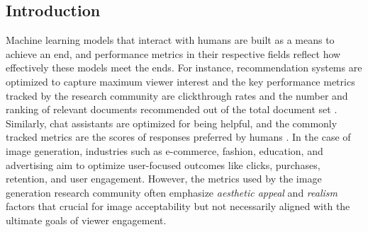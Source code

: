 \subsection{Introduction}
 \label{sec:intro}

 
 Machine learning models that interact with humans are built as a means to achieve an end, and performance metrics in their respective fields reflect how effectively these models meet the ends. For instance, recommendation systems are optimized to capture maximum viewer interest and the key performance metrics tracked by the research community are clickthrough rates and the number and ranking of relevant documents recommended out of the total document set \cite{bobadilla2013recommender}. Similarly, chat assistants are optimized for being helpful, and the commonly tracked metrics are the scores of responses preferred by humans \cite{ouyang2022training,stiennon2020learning}. In the case of image generation, industries such as e-commerce, fashion, education, and advertising aim to optimize user-focused outcomes like clicks, purchases, retention, and user engagement. However, the metrics used by the image generation research community often emphasize \textit{aesthetic appeal} \cite{xu2024imagereward,kirstain2023pick,black2023training} and \textit{realism} \cite{dhariwal2021diffusion,saharia2022photorealistic,ho2020denoising,rombach2022high} factors that crucial for image acceptability but not necessarily aligned with the ultimate goals of viewer engagement. 
 
 
